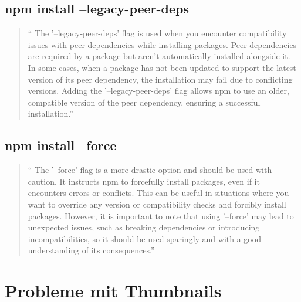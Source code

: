 \begin{spacing}{1}
    \subsection{npm install --legacy-peer-deps}\label{subsec:npm-install---legacy-peer-deps}
    \begin{quotation}
        ``
        The '--legacy-peer-deps' flag is used when you encounter compatibility issues with peer dependencies
        while installing packages.
        Peer dependencies are required by a package but aren't automatically
        installed alongside it.
        In some cases, when a package has not been updated to support the latest
        version of its peer dependency, the installation may fail due to conflicting versions.
        Adding the '--legacy-peer-deps' flag allows npm to use an older, compatible version of
        the peer dependency, ensuring a successful installation.''
        \cite{installFlags}
    \end{quotation}

    \subsection{npm install --force}\label{subsec:npm-install---force}
    \begin{quotation}
        ``
        The '--force'  flag is a more drastic option and should be used with caution.
        It instructs npm to forcefully install packages, even if it encounters errors or conflicts.
        This can be useful in situations where you want to override any version or compatibility checks
        and forcibly install packages.
        However, it is important to note that using '--force'
        may lead to unexpected issues, such as breaking dependencies or introducing incompatibilities,
        so it should be used sparingly and with a good understanding of its consequences.''
        ~\cite{installFlags}
    \end{quotation}



    \section{Probleme mit Thumbnails}\label{sec:probleme-mit-thumbnails}



\end{spacing}
